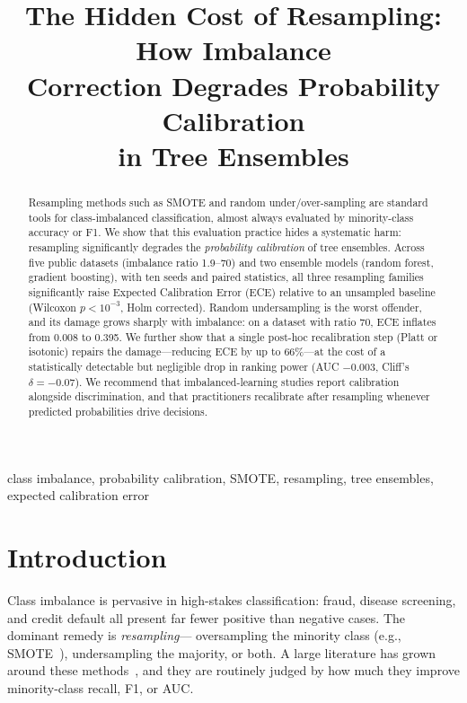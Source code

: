 \documentclass[conference]{IEEEtran}
\begin{document}
\title{The Hidden Cost of Resampling: How Imbalance\\
Correction Degrades Probability Calibration\\
in Tree Ensembles}

\author{
}

\maketitle

\begin{abstract}
Resampling methods such as SMOTE and random under/over-sampling are
standard tools for class-imbalanced classification, almost always
evaluated by minority-class accuracy or F1. We show that this evaluation
practice hides a systematic harm: resampling significantly degrades the
\emph{probability calibration} of tree ensembles. Across five public
datasets (imbalance ratio 1.9--70) and two ensemble models (random
forest, gradient boosting), with ten seeds and paired statistics, all
three resampling families significantly raise Expected Calibration Error
(ECE) relative to an unsampled baseline (Wilcoxon $p<10^{-3}$, Holm
corrected). Random undersampling is the worst offender, and its damage
grows sharply with imbalance: on a dataset with ratio 70, ECE inflates
from 0.008 to 0.395. We further show that a single post-hoc
recalibration step (Platt or isotonic) repairs the damage---reducing ECE
by up to 66\%---at the cost of a statistically detectable but negligible
drop in ranking power (AUC $-0.003$, Cliff's $\delta=-0.07$). We
recommend that imbalanced-learning studies report calibration alongside
discrimination, and that practitioners recalibrate after resampling
whenever predicted probabilities drive decisions.
\end{abstract}

\begin{IEEEkeywords}
class imbalance, probability calibration, SMOTE, resampling, tree
ensembles, expected calibration error
\end{IEEEkeywords}

\section{Introduction}
Class imbalance is pervasive in high-stakes classification: fraud,
disease screening, and credit default all present far fewer positive
than negative cases. The dominant remedy is \emph{resampling}---
oversampling the minority class (e.g., SMOTE~\cite{chawla2002smote}),
undersampling the majority, or both. A large literature has grown around
these methods~\cite{fernandez2018smote}, and they are routinely judged
by how much they improve minority-class recall, F1, or AUC.
\end{document}
